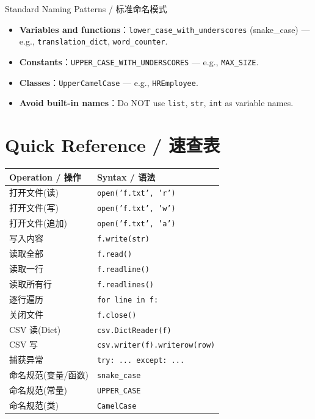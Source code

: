 \documentclass[11pt,a4paper]{article}
\begin{document}
\begin{concept}{Standard Naming Patterns / 标准命名模式}
    \begin{itemize}[itemsep=0.5em]
        \item \textbf{Variables and functions}：\texttt{lower\_case\_with\_underscores} (snake\_case) — e.g., \texttt{translation\_dict}, \texttt{word\_counter}.
        \item \textbf{Constants}：\texttt{UPPER\_CASE\_WITH\_UNDERSCORES} — e.g., \texttt{MAX\_SIZE}.
        \item \textbf{Classes}：\texttt{UpperCamelCase} — e.g., \texttt{HREmployee}.
        \item \textbf{Avoid built-in names}：Do NOT use \texttt{list}, \texttt{str}, \texttt{int} as variable names.
    \end{itemize}
\end{concept}

\section{Quick Reference / 速查表}

\begin{table}[h]
\centering
\small
\renewcommand{\arraystretch}{1.3}
\begin{tabular}{@{}ll@{}}
\toprule
\textbf{Operation / 操作} & \textbf{Syntax / 语法} \\ \midrule
打开文件(读) & \texttt{open('f.txt', 'r')} \\
打开文件(写) & \texttt{open('f.txt', 'w')} \\
打开文件(追加) & \texttt{open('f.txt', 'a')} \\
写入内容 & \texttt{f.write(str)} \\
读取全部 & \texttt{f.read()} \\
读取一行 & \texttt{f.readline()} \\
读取所有行 & \texttt{f.readlines()} \\
逐行遍历 & \texttt{for line in f:} \\
关闭文件 & \texttt{f.close()} \\
CSV 读(Dict) & \texttt{csv.DictReader(f)} \\
CSV 写 & \texttt{csv.writer(f).writerow(row)} \\
捕获异常 & \texttt{try: ... except: ...} \\
命名规范(变量/函数) & \texttt{snake\_case} \\
命名规范(常量) & \texttt{UPPER\_CASE} \\
命名规范(类) & \texttt{CamelCase} \\ \bottomrule
\end{tabular}
\end{table}
\end{document}
